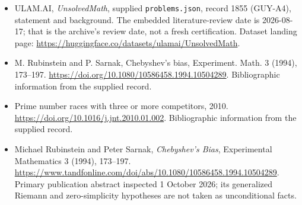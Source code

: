 \documentclass[11pt,a4paper]{article}
\begin{document}
{\small

\begin{itemize}

\item[\hypertarget{source:1855:1}{S1}] ULAM.AI, \emph{UnsolvedMath}, supplied \texttt{problems.json}, record 1855 (GUY-A4), statement and background. The embedded literature-review date is 2026-08-17; that is the archive’s review date, not a fresh certification. Dataset landing page: \url{https://huggingface.co/datasets/ulamai/UnsolvedMath}.

\item[\hypertarget{source:1855:2}{S2}] M. Rubinstein and P. Sarnak, Chebyshev's bias, Experiment. Math. 3 (1994), 173--197. \url{https://doi.org/10.1080/10586458.1994.10504289}. Bibliographic information from the supplied record.

\item[\hypertarget{source:1855:3}{S3}] Prime number races with three or more competitors, 2010. \url{https://doi.org/10.1016/j.jnt.2010.01.002}. Bibliographic information from the supplied record.


\item[E1] Michael Rubinstein and Peter Sarnak, \emph{Chebyshev's Bias},
Experimental Mathematics 3 (1994), 173--197.
\url{https://www.tandfonline.com/doi/abs/10.1080/10586458.1994.10504289}.
Primary publication abstract inspected 1 October 2026; its generalized
Riemann and zero-simplicity hypotheses are not taken as unconditional facts.

\end{itemize}

}

\label{end:1855}
\end{document}
